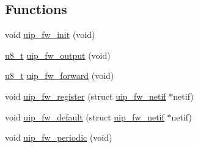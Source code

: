 \subsection*{Functions}
\begin{DoxyCompactItemize}
\item 
void \hyperlink{group__uipfw_ga0c90f476e0557afaee479c61d4d3eaf3}{uip\_\-fw\_\-init} (void)
\item 
\hyperlink{group__uipfw_ga4caecabca98b43919dd11be1c0d4cd8e}{u8\_\-t} \hyperlink{group__uipfw_gabc6fe2d1544b0a16ee3f3fc1c1ccf93a}{uip\_\-fw\_\-output} (void)
\item 
\hyperlink{group__uipfw_ga4caecabca98b43919dd11be1c0d4cd8e}{u8\_\-t} \hyperlink{group__uipfw_ga208866aad58f1fb9d5f9e37713f9f4e5}{uip\_\-fw\_\-forward} (void)
\item 
void \hyperlink{group__uipfw_gaa2d5cfe32c9ec743e956c4e19dcee21a}{uip\_\-fw\_\-register} (struct \hyperlink{structuip__fw__netif}{uip\_\-fw\_\-netif} $\ast$netif)
\item 
void \hyperlink{group__uipfw_ga94dcf0fa8bff34949a37fbde77786f82}{uip\_\-fw\_\-default} (struct \hyperlink{structuip__fw__netif}{uip\_\-fw\_\-netif} $\ast$netif)
\item 
void \hyperlink{group__uipfw_ga35ab515cdae08d65c5d080771754f62a}{uip\_\-fw\_\-periodic} (void)
\end{DoxyCompactItemize}
